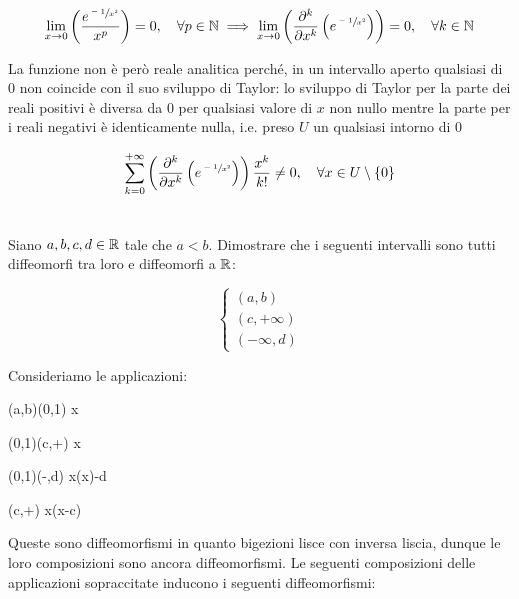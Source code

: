 \begin{equation}
	\lim_{x \to 0} \left( \dfrac{e^{\sfrac{-1}{x^{2}}}}{x^{p}} \right) = 0 \qcomma \forall p \in \N %
	\implies%
	\lim_{x \to 0} \left( \pdv[k]{x} \left( e^{\sfrac{-1}{x^{2}}} \right) \right) = 0 \qcomma \forall k \in \N
\end{equation}

La funzione non è però reale analitica perché, in un intervallo aperto qualsiasi di 0 non coincide con il suo sviluppo di Taylor: lo sviluppo di Taylor per la parte dei reali positivi è diversa da 0 per qualsiasi valore di $ x $ non nullo mentre la parte per i reali negativi è identicamente nulla, i.e. preso $ U $ un qualsiasi intorno di 0

\begin{equation}
	\sum_{k=0}^{+\infty} \left( \pdv[k]{x} \left( e^{\sfrac{-1}{x^{2}}} \right) \right) \dfrac{x^{k}}{k!} \neq 0 \qcomma \forall x \in U \setminus \{0\}
\end{equation}

\tocless\section{}\label{es1-3}

\begin{tcolorbox}
	Siano $ a,b,c,d \in \mathbb{R} $ tale che $ a<b $. Dimostrare che i seguenti intervalli sono tutti diffeomorfi tra loro e diffeomorfi a $ \mathbb{R} $:
	
	\begin{equation}
		\begin{cases}
			(a,b)\\
			(c,+\infty)\\
			(-\infty,d)
		\end{cases}
	\end{equation}
\end{tcolorbox}

Consideriamo le applicazioni:

%
	{(a,b)}{(0,1)}%
	{x}{}

%
	{(0,1)}{(c,+\infty)}%
	{x}{}
	
%
	{(0,1)}{(-\infty,d)}%
	{x}{\ln(x)-d}
	
%
	{(c,+\infty)}{\R}%
	{x}{\ln(x-c)}

Queste sono diffeomorfismi in quanto bigezioni lisce con inversa liscia, dunque le loro composizioni sono ancora diffeomorfismi. Le seguenti composizioni delle applicazioni sopraccitate inducono i seguenti diffeomorfismi:


